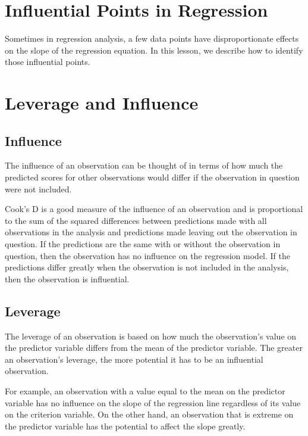 \documentclass[residuals.tex]{subfiles}
\begin{document}
\newpage
	
\section{Influential Points in Regression}
 

Sometimes in regression analysis, a few data points have disproportionate effects on the slope of the regression equation. In this lesson, we describe how to identify those influential points.

\newpage
\section{Leverage and Influence}
\subsection{Influence}
The influence of an observation can be thought of in terms of how much the predicted scores for other observations would differ if the observation in question were not included. 

Cook's D is a good measure of the influence of an observation and is proportional to the sum of the squared differences between predictions made with all observations in the analysis and predictions made leaving out the observation in question. If the predictions are the same with or without the observation in question, then the observation has no influence on the regression model. If the predictions differ greatly when the observation is not included in the analysis, then the observation is influential.


\subsection{Leverage}
The leverage of an observation is based on how much the observation's value on the predictor variable differs from the mean of the predictor variable. The greater an observation's leverage, the more potential it has to be an influential observation. 

For example, an observation with a value equal to the mean on the predictor variable has no influence on the slope of the regression line regardless of its value on the criterion variable. On the other hand, an observation that is extreme on the predictor variable has the potential to affect the slope greatly.
\end{document}
